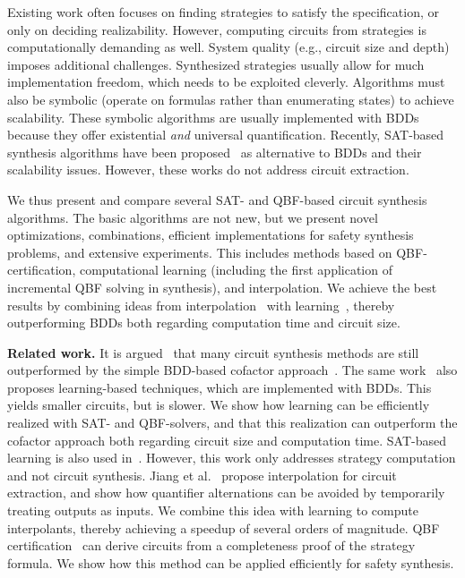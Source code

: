 \documentclass[conference]{IEEEtran}
\begin{document}
Existing work often focuses on finding strategies to satisfy the specification, 
or only on deciding realizability. However, computing circuits from strategies 
is computationally demanding as well.  System quality (e.g., circuit size and 
depth) imposes additional challenges. Synthesized strategies usually allow for 
much implementation freedom, which needs to be exploited cleverly. Algorithms 
must also be symbolic (operate on formulas rather than enumerating states) to 
achieve scalability.  These symbolic algorithms are usually implemented with 
BDDs because they offer existential \emph{and} universal quantification. 
Recently, SAT-based synthesis algorithms have been 
proposed~\cite{MorgensternGS13,BloemKS14} as alternative to BDDs and their 
scalability issues. However, these works do not address circuit extraction.

We thus present and compare several SAT- and QBF-based circuit synthesis 
algorithms.  The basic algorithms are not new, but we present novel 
optimizations, combinations, efficient implementations for safety synthesis 
problems, and extensive experiments.  This includes methods based on 
QBF-certification, computational learning (including the first application of 
incremental QBF solving in synthesis), and interpolation.  We achieve the best 
results by combining ideas from interpolation~\cite{JiangLH09} with 
learning~\cite{EhlersKH12}, thereby outperforming BDDs both regarding 
computation time and circuit size.

\textbf{Related work.} It is argued~\cite{EhlersKH12} that many circuit 
synthesis methods are still outperformed by the simple BDD-based cofactor 
approach~\cite{BloemGJPPW07}. The same work~\cite{EhlersKH12} also proposes 
learning-based techniques, which are implemented with BDDs.  This yields smaller 
circuits, but is slower.  We show how learning can be efficiently realized with 
SAT- and QBF-solvers, and that this realization can outperform the cofactor 
approach both regarding circuit size and computation time.  SAT-based learning 
is also used in~\cite{BloemKS14}.  However, this work only addresses strategy 
computation and not circuit synthesis.  Jiang et al.~\cite{JiangLH09} propose 
interpolation for circuit extraction, and show how quantifier alternations can 
be avoided by temporarily treating outputs as inputs. We combine this idea with 
learning to compute interpolants, thereby achieving a speedup of several orders 
of magnitude.  QBF certification~\cite{NiemetzPLSB12} can derive circuits from a 
completeness proof of the strategy formula.  We show how this method can be 
applied efficiently for safety synthesis.
\end{document}
